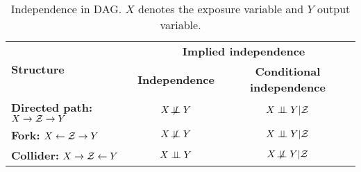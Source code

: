 \begin{table}[h]
    \centering
    \begin{tabular}{l|c|c}
        \hline\hline
        \multirow{2}{2cm}{\textbf{Structure}}
         &
        \multicolumn{2}{c}{\textbf{Implied independence}} \\
        \cline{2-3}
        &
        \textbf{Independence}
        &
        \textbf{Conditional independence}
        \\
        \hline\hline
        \wrap{\textbf{Directed path:} \\
        $X\rightarrow\mathcal{Z}\rightarrow Y$}
        &
        $X\not\!\perp \!\!\! \perp Y$
        &
        $X\perp \!\!\! \perp Y | \mathcal{Z}$
        \\
        \hline
        \wrap{\textbf{Fork:} \\
        $X\leftarrow\mathcal{Z}\rightarrow Y$}
        &
        $X\not\!\perp \!\!\! \perp Y$
        &
        $X\perp \!\!\! \perp Y | \mathcal{Z}$
        \\
        \hline
        \wrap{\textbf{Collider:} \\
        $X\rightarrow\mathcal{Z}\leftarrow Y$}
        &
        $X\perp \!\!\! \perp Y$
        &
        $X\not\!\perp \!\!\! \perp Y | \mathcal{Z}$ \\
        \hline\hline
    \end{tabular}
    \caption{Independence in DAG. $X$ denotes the exposure variable and $Y$ output variable.}
    \label{tab:independence}
\end{table}